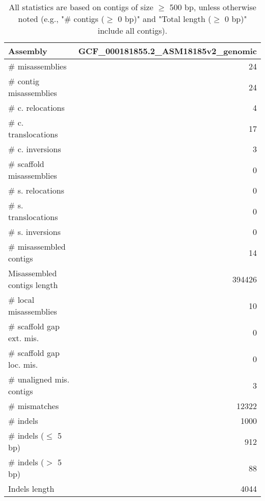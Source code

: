 \documentclass[12pt,a4paper]{article}
\begin{document}
\begin{table}[ht]
\begin{center}
\caption{All statistics are based on contigs of size $\geq$ 500 bp, unless otherwise noted (e.g., "\# contigs ($\geq$ 0 bp)" and "Total length ($\geq$ 0 bp)" include all contigs).}
\begin{tabular}{|l*{1}{|r}|}
\hline
Assembly & GCF\_000181855.2\_ASM18185v2\_genomic \\ \hline
\# misassemblies & 24 \\ \hline
\hspace{2mm}\# contig misassemblies & 24 \\ \hline
\hspace{5mm}\# c. relocations & 4 \\ \hline
\hspace{5mm}\# c. translocations & 17 \\ \hline
\hspace{5mm}\# c. inversions & 3 \\ \hline
\hspace{2mm}\# scaffold misassemblies & 0 \\ \hline
\hspace{5mm}\# s. relocations & 0 \\ \hline
\hspace{5mm}\# s. translocations & 0 \\ \hline
\hspace{5mm}\# s. inversions & 0 \\ \hline
\# misassembled contigs & 14 \\ \hline
Misassembled contigs length & 394426 \\ \hline
\# local misassemblies & 10 \\ \hline
\# scaffold gap ext. mis. & 0 \\ \hline
\# scaffold gap loc. mis. & 0 \\ \hline
\# unaligned mis. contigs & 3 \\ \hline
\# mismatches & 12322 \\ \hline
\# indels & 1000 \\ \hline
\hspace{5mm}\# indels ($\leq$ 5 bp) & 912 \\ \hline
\hspace{5mm}\# indels ($>$ 5 bp) & 88 \\ \hline
Indels length & 4044 \\ \hline
\end{tabular}
\end{center}
\end{table}
\end{document}
